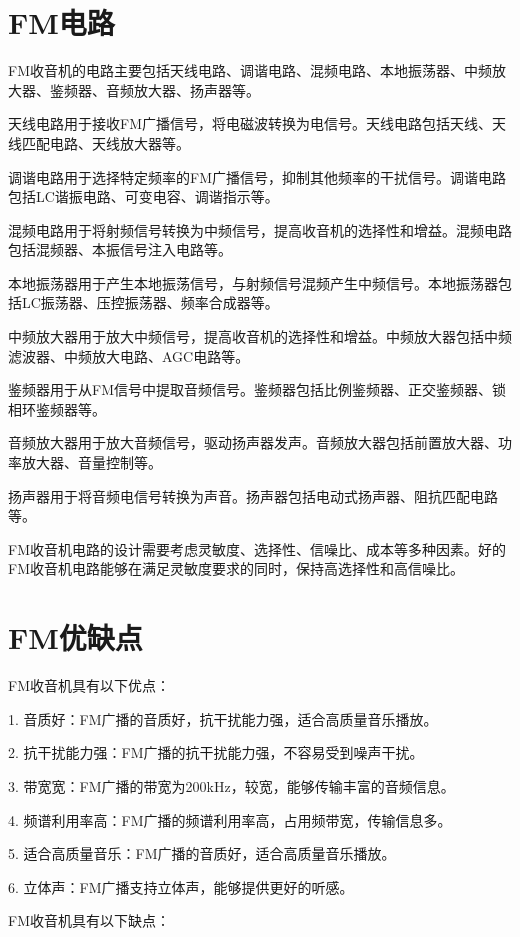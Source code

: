 \documentclass[12pt,UTF8]{ctexbook}
\begin{document}
\section{FM电路}

FM收音机的电路主要包括天线电路、调谐电路、混频电路、本地振荡器、中频放大器、鉴频器、音频放大器、扬声器等。

天线电路用于接收FM广播信号，将电磁波转换为电信号。天线电路包括天线、天线匹配电路、天线放大器等。

调谐电路用于选择特定频率的FM广播信号，抑制其他频率的干扰信号。调谐电路包括LC谐振电路、可变电容、调谐指示等。

混频电路用于将射频信号转换为中频信号，提高收音机的选择性和增益。混频电路包括混频器、本振信号注入电路等。

本地振荡器用于产生本地振荡信号，与射频信号混频产生中频信号。本地振荡器包括LC振荡器、压控振荡器、频率合成器等。

中频放大器用于放大中频信号，提高收音机的选择性和增益。中频放大器包括中频滤波器、中频放大电路、AGC电路等。

鉴频器用于从FM信号中提取音频信号。鉴频器包括比例鉴频器、正交鉴频器、锁相环鉴频器等。

音频放大器用于放大音频信号，驱动扬声器发声。音频放大器包括前置放大器、功率放大器、音量控制等。

扬声器用于将音频电信号转换为声音。扬声器包括电动式扬声器、阻抗匹配电路等。

FM收音机电路的设计需要考虑灵敏度、选择性、信噪比、成本等多种因素。好的FM收音机电路能够在满足灵敏度要求的同时，保持高选择性和高信噪比。

\section{FM优缺点}

FM收音机具有以下优点：

1. 音质好：FM广播的音质好，抗干扰能力强，适合高质量音乐播放。

2. 抗干扰能力强：FM广播的抗干扰能力强，不容易受到噪声干扰。

3. 带宽宽：FM广播的带宽为200kHz，较宽，能够传输丰富的音频信息。

4. 频谱利用率高：FM广播的频谱利用率高，占用频带宽，传输信息多。

5. 适合高质量音乐：FM广播的音质好，适合高质量音乐播放。

6. 立体声：FM广播支持立体声，能够提供更好的听感。

FM收音机具有以下缺点：
\end{document}
